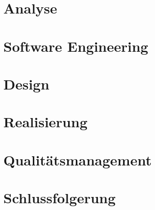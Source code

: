 \documentclass[12pt, a4paper]{report}
\begin{document}
	
	
	\chapter{Analyse}
	
		
		
	
	
	\chapter{Software Engineering}
		
	
	\chapter{Design}
	
	
	
	
	\chapter{Realisierung}
	
	
	
	\chapter{Qualitätsmanagement}
	
	
	
	\chapter{Schlussfolgerung}
	
\end{document}

